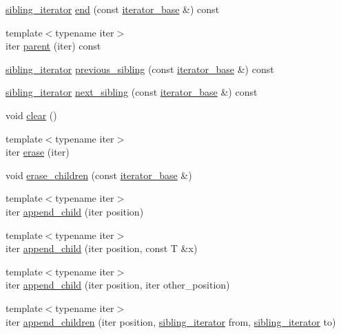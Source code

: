 \begin{CompactItemize}
\item 
\hyperlink{classtree_1_1sibling__iterator}{sibling\_\-iterator} \hyperlink{classtree_a6aa8b0c6af0f50bfc86592847759127}{end} (const \hyperlink{classtree_1_1iterator__base}{iterator\_\-base} \&) const 
\item 
{\footnotesize template$<$typename iter$>$ }\\iter \hyperlink{classtree_aaaa1622d2d58ecda846640bd8f8bd28}{parent} (iter) const 
\item 
\hyperlink{classtree_1_1sibling__iterator}{sibling\_\-iterator} \hyperlink{classtree_a21d6a467bc4d17cfdaf37292c971468}{previous\_\-sibling} (const \hyperlink{classtree_1_1iterator__base}{iterator\_\-base} \&) const 
\item 
\hyperlink{classtree_1_1sibling__iterator}{sibling\_\-iterator} \hyperlink{classtree_29f1278d76269eb71f2e9ff2bb722780}{next\_\-sibling} (const \hyperlink{classtree_1_1iterator__base}{iterator\_\-base} \&) const 
\item 
void \hyperlink{classtree_a8cf6dfe17504abfc0ffabb5a4ba9d0a}{clear} ()
\item 
{\footnotesize template$<$typename iter$>$ }\\iter \hyperlink{classtree_3eb424c89446ae17a747d2aca2cdda4b}{erase} (iter)
\item 
void \hyperlink{classtree_05d5fd71c206efc8ac30df5cd46176bc}{erase\_\-children} (const \hyperlink{classtree_1_1iterator__base}{iterator\_\-base} \&)
\item 
{\footnotesize template$<$typename iter$>$ }\\iter \hyperlink{classtree_8d68e95f5088d48cb54fd6ae381729f0}{append\_\-child} (iter position)
\item 
{\footnotesize template$<$typename iter$>$ }\\iter \hyperlink{classtree_9318fa77c4e10ec0a9a26a0d08f182a2}{append\_\-child} (iter position, const T \&x)
\item 
{\footnotesize template$<$typename iter$>$ }\\iter \hyperlink{classtree_1fb4734b783fed4a66c24130af67316e}{append\_\-child} (iter position, iter other\_\-position)
\item 
{\footnotesize template$<$typename iter$>$ }\\iter \hyperlink{classtree_92ab22e0a98d8899c0d1b6c9d0a85465}{append\_\-children} (iter position, \hyperlink{classtree_1_1sibling__iterator}{sibling\_\-iterator} from, \hyperlink{classtree_1_1sibling__iterator}{sibling\_\-iterator} to)
\item 

\end{CompactItemize}
